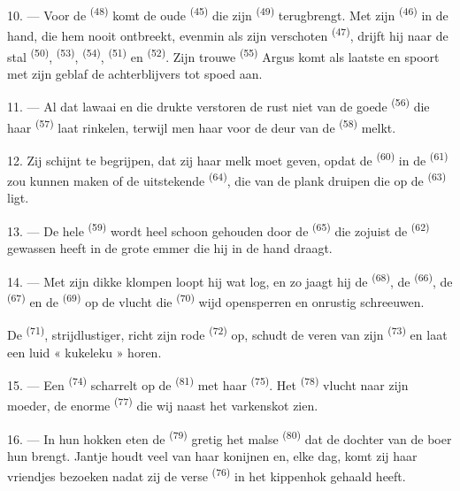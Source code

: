 10. --- Voor de  \textsuperscript{(48)} komt de oude
 \textsuperscript{(45)} die zijn 
\textsuperscript{(49)} terugbrengt. Met zijn  \textsuperscript{(46)} in de
hand, die hem nooit ontbreekt, evenmin als zijn verschoten 
\textsuperscript{(47)}, drijft hij naar de stal
 \textsuperscript{(50)}, 
\textsuperscript{(53)},  \textsuperscript{(54)},
 \textsuperscript{(51)} en 
\textsuperscript{(52)}. Zijn trouwe  \textsuperscript{(55)} Argus komt als
laatste en spoort met zijn geblaf de achterblijvers tot spoed aan.

11. --- Al dat lawaai en die drukte verstoren de rust niet van de goede
 \textsuperscript{(56)} die haar 
\textsuperscript{(57)} laat rinkelen, terwijl men haar voor de deur van de
 \textsuperscript{(58)} melkt.

12. Zij schijnt te begrijpen, dat zij haar melk moet geven, opdat de
 \textsuperscript{(60)}  in de 
\textsuperscript{(61)} zou kunnen maken of de uitstekende 
\textsuperscript{(64)}, die van de plank druipen die op de 
\textsuperscript{(63)} ligt.

13. --- De hele  \textsuperscript{(59)} wordt heel schoon gehouden door de
 \textsuperscript{(65)} die zojuist de
 \textsuperscript{(62)} gewassen heeft in de grote emmer die
hij in de hand draagt.

\VUsaut{3.0mm}
\VUsaut{3.0mm}

14. --- Met zijn dikke klompen loopt hij wat log, en zo jaagt hij de
 \textsuperscript{(68)}, de 
\textsuperscript{(66)}, de  \textsuperscript{(67)} en de
 \textsuperscript{(69)} op de vlucht die 
\textsuperscript{(70)} wijd opensperren en onrustig schreeuwen.

De  \textsuperscript{(71)}, strijdlustiger, richt zijn rode
 \textsuperscript{(72)} op, schudt de veren van zijn 
\textsuperscript{(73)} en laat een luid « kukeleku » horen.

15. --- Een  \textsuperscript{(74)} scharrelt op de
 \textsuperscript{(81)} met haar 
\textsuperscript{(75)}. Het  \textsuperscript{(78)} vlucht naar zijn moeder,
de enorme  \textsuperscript{(77)} die wij naast het varkenskot zien.

16. --- In hun hokken eten de  \textsuperscript{(79)} gretig het malse
 \textsuperscript{(80)} dat de dochter van de boer hun brengt. Jantje houdt veel
van haar konijnen en, elke dag, komt zij haar vriendjes bezoeken nadat zij de verse
 \textsuperscript{(76)} in het kippenhok gehaald heeft.
\VUsaut{6.0mm}
\VUfilet{22mm}
